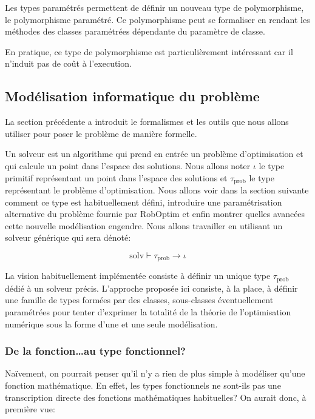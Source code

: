Les types paramétrés permettent de définir un nouveau type de
polymorphisme, le polymorphisme
paramétré. Ce
polymorphisme peut se formaliser en rendant les méthodes des classes
paramétrées dépendante du paramètre de classe.

En pratique, ce type de polymorphisme est particulièrement intéressant
car il n'induit pas de coût à l'execution.


\subsection{Modélisation informatique du problème}

La section précédente a introduit le formalismes et les outils que
nous allons utiliser pour poser le problème de manière formelle.


Un solveur est un algorithme qui prend en entrée un problème
d'optimisation et qui calcule un point dans l'espace des solutions.
Nous allons noter $\iota$ le type primitif représentant un point dans
l'espace des solutions et $\tau_{\text{prob}}$ le type représentant le
problème d'optimisation. Nous allons voir dans la section suivante
comment ce type est habituellement défini, introduire une
paramétrisation alternative du problème fournie par RobOptim et enfin
montrer quelles avancées cette nouvelle modélisation engendre.  Nous
allons travailler en utilisant un solveur générique qui sera dénoté:


\begin{equation}
  \text{solv} \vdash \tau_{\text{prob}} \rightarrow \iota
\end{equation}


La vision habituellement implémentée consiste à définir un unique type
$\tau_{\text{prob}}$ dédié à un solveur précis. L'approche proposée
ici consiste, à la place, à définir une famille de types formées par
des classes, sous-classes éventuellement paramétrées pour tenter
d'exprimer la totalité de la théorie de l'optimisation numérique sous
la forme d'une et une seule modélisation.


\subsubsection{De la fonction\ldots au type fonctionnel?}


Naïvement, on pourrait penser qu'il n'y a rien de plus simple à
modéliser qu'une fonction mathématique. En effet, les types
fonctionnels ne sont-ils pas une transcription directe des fonctions
mathématiques habituelles? On aurait donc, à première vue:

